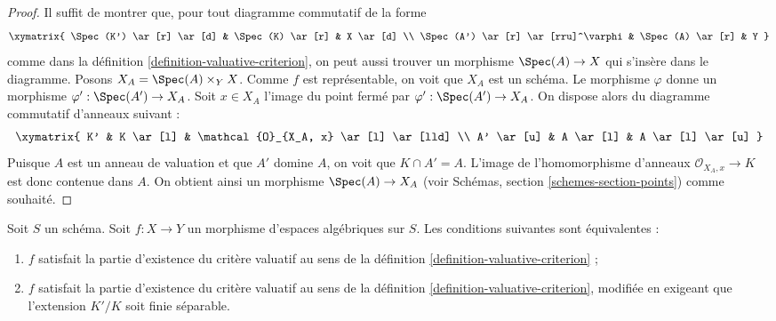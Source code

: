 \begin{proof}
Il suffit de montrer que, pour tout diagramme commutatif de la forme
$$
\xymatrix{
\Spec(K') \ar[r] \ar[d] & \Spec(K) \ar[r] & X \ar[d] \\
\Spec(A') \ar[r] \ar[rru]^\varphi & \Spec(A) \ar[r] & Y
}
$$
comme dans la définition \ref{definition-valuative-criterion}, on peut aussi
trouver un morphisme $\Spec(A) \to X$ qui s'insère dans le diagramme.
Posons $X_A = \Spec(A) \times_Y X$. Comme $f$ est représentable, on voit
que $X_A$ est un schéma. Le morphisme $\varphi$ donne un morphisme
$\varphi' : \Spec(A') \to X_A$. Soit $x \in X_A$ l'image du
point fermé par $\varphi' : \Spec(A') \to X_A$. On dispose alors du
diagramme commutatif d'anneaux suivant :
$$
\xymatrix{
K' & K \ar[l] & \mathcal{O}_{X_A, x} \ar[l] \ar[lld] \\
A' \ar[u] & A \ar[l] & A \ar[l] \ar[u]
}
$$
Puisque $A$ est un anneau de valuation et que $A'$ domine $A$, on voit
que $K \cap A' = A$. L'image de l'homomorphisme d'anneaux $\mathcal{O}_{X_A, x} \to K$
est donc contenue dans $A$. On obtient ainsi un morphisme $\Spec(A) \to X_A$ (voir
Schémas, section \ref{schemes-section-points})
comme souhaité.
\end{proof}

\begin{lemma}
\label{lemma-finite-separable-enough}
Soit $S$ un schéma.
Soit $f : X \to Y$ un morphisme d'espaces algébriques sur $S$.
Les conditions suivantes sont équivalentes :
\begin{enumerate}
\item $f$ satisfait la partie d'existence du critère valuatif
au sens de la définition \ref{definition-valuative-criterion} ;
\item $f$ satisfait la partie d'existence du critère valuatif
au sens de la définition \ref{definition-valuative-criterion}, modifiée en
exigeant que l'extension $K'/K$ soit finie séparable.
\end{enumerate}
\end{lemma}

